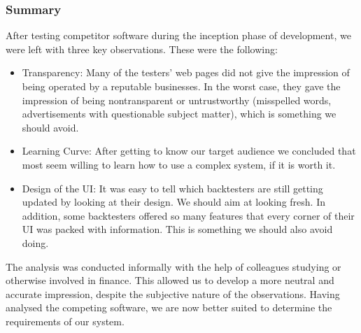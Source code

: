 \documentclass[main.tex]{subfiles}
\begin{document}
\subsubsection{Summary}
\label{reliability}

After testing competitor software during the inception phase of development, we were left with three key observations. These were the following:

\begin{itemize}
    \item Transparency: Many of the testers' web pages did not give the impression of being operated by a reputable businesses. In the worst case, they gave the impression of being nontransparent or untrustworthy (misspelled words, advertisements with questionable subject matter), which is something we should avoid.
    \item Learning Curve: After getting to know our target audience we concluded that most seem willing to learn how to use a complex system, if it is worth it.
    \item Design of the UI: It was easy to tell which backtesters are still getting updated by looking at their design. We should aim at looking fresh. In addition, some backtesters offered so many features that every corner of their UI was packed with information. This is something we should also avoid doing.
\end{itemize}

The analysis was conducted informally with the help of colleagues studying or otherwise involved in finance. This allowed us to develop a more neutral and accurate impression, despite the subjective nature of the observations. Having analysed the competing software, we are now better suited to determine the requirements of our system. 
\end{document}
